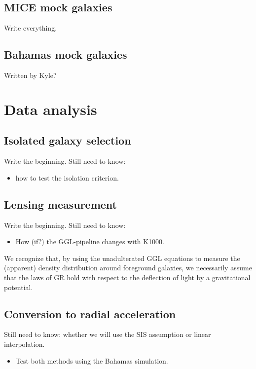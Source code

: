 \documentclass[fleqn,usenatbib]{mnras}
\begin{document}
\subsection{MICE mock galaxies}
\label{sec:mice_mocks}
Write everything.

\subsection{Bahamas mock galaxies}
\label{sec:bahamas_mocks}
Written by Kyle?

\section{Data analysis}
\label{sec:analysis}

\subsection{Isolated galaxy selection}
\label{sec:isolation}
Write the beginning.
Still need to know:
\begin{itemize}
	\item how to test the isolation criterion.
\end{itemize}

\subsection{Lensing measurement}
\label{sec:lensing}
Write the beginning.
Still need to know:
\begin{itemize}
	\item How (if?) the GGL-pipeline changes with K1000.
\end{itemize}

We recognize that, by using the unadulterated GGL equations to measure the (apparent) density distribution around foreground galaxies, we necessarily assume that the laws of GR hold with respect to the deflection of light by a gravitational potential.

\subsection{Conversion to radial acceleration}
\label{sec:conversion}
Still need to know: whether we will use the SIS assumption or linear interpolation.
\begin{itemize}
	\item Test both methods using the Bahamas simulation.
\end{itemize}
	
\end{document}
